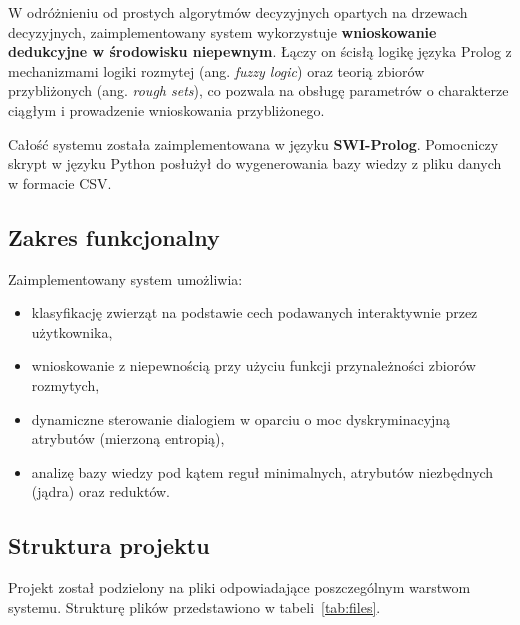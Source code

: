 \documentclass[11pt,a4paper]{article}
\begin{document}
W odróżnieniu od prostych algorytmów decyzyjnych opartych na drzewach
decyzyjnych, zaimplementowany system wykorzystuje \textbf{wnioskowanie
dedukcyjne w środowisku niepewnym}. Łączy on ścisłą logikę języka Prolog
z mechanizmami logiki rozmytej (ang. \textit{fuzzy logic}) oraz teorią zbiorów
przybliżonych (ang. \textit{rough sets}), co pozwala na obsługę parametrów
o charakterze ciągłym i prowadzenie wnioskowania przybliżonego.

Całość systemu została zaimplementowana w języku \textbf{SWI-Prolog}.
Pomocniczy skrypt w języku Python posłużył do wygenerowania bazy wiedzy
z pliku danych w formacie CSV.

\subsection{Zakres funkcjonalny}
Zaimplementowany system umożliwia:
\begin{itemize}[noitemsep]
    \item klasyfikację zwierząt na podstawie cech podawanych interaktywnie przez
          użytkownika,
    \item wnioskowanie z niepewnością przy użyciu funkcji przynależności zbiorów
          rozmytych,
    \item dynamiczne sterowanie dialogiem w oparciu o moc dyskryminacyjną
          atrybutów (mierzoną entropią),
    \item analizę bazy wiedzy pod kątem reguł minimalnych, atrybutów niezbędnych
          (jądra) oraz reduktów.
\end{itemize}

\subsection{Struktura projektu}
Projekt został podzielony na pliki odpowiadające poszczególnym warstwom systemu.
Strukturę plików przedstawiono w tabeli~\ref{tab:files}.
\end{document}
